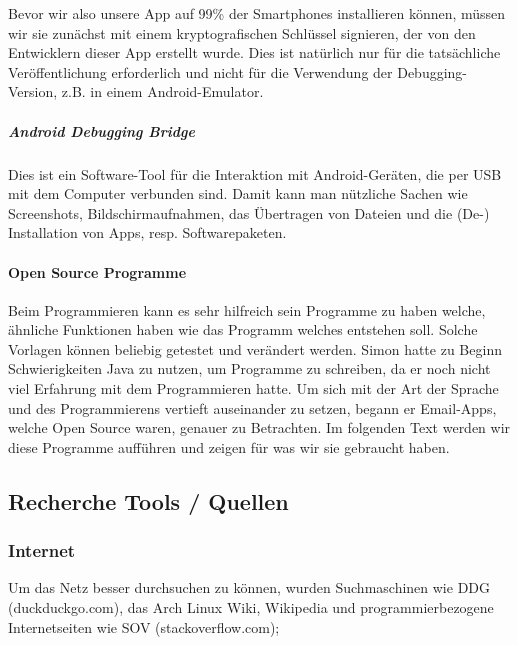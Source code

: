 \documentclass[a4paper,11pt]{article}
\begin{document}
Bevor wir also unsere App auf 99\% der Smartphones installieren können, müssen wir sie zunächst mit einem kryptografischen Schlüssel signieren, der von den Entwicklern dieser App erstellt wurde. Dies ist natürlich nur für die tatsächliche Veröffentlichung erforderlich und nicht für die Verwendung der Debugging-Version, z.B. in einem Android-Emulator.

\subparagraph{Android Debugging Bridge}

Dies ist ein Software-Tool für die Interaktion mit Android-Geräten, die per USB mit dem Computer verbunden sind. Damit kann man nützliche Sachen wie Screenshots, Bildschirmaufnahmen, das Übertragen von Dateien und die (De-) Installation von Apps, resp. Softwarepaketen.

\paragraph{Open Source Programme}

Beim Programmieren kann es sehr hilfreich sein Programme zu haben welche, ähnliche Funktionen haben wie das Programm welches entstehen soll. 
Solche Vorlagen können beliebig getestet und verändert werden. Simon hatte zu Beginn Schwierigkeiten Java zu nutzen, um Programme zu schreiben, da er noch nicht viel 
Erfahrung mit dem Programmieren hatte. Um sich mit der Art der Sprache und des Programmierens vertieft auseinander zu setzen, begann er Email-Apps, welche Open Source
waren, genauer zu Betrachten. Im folgenden Text werden wir diese Programme aufführen und zeigen für was wir sie gebraucht haben. 


\subsection{Recherche Tools / Quellen}
\subsubsection{Internet}
Um das Netz besser durchsuchen zu können, wurden Suchmaschinen wie DDG (duckduckgo.com), das Arch Linux Wiki, Wikipedia und programmierbezogene Internetseiten wie SOV (stackoverflow.com);
\end{document}
